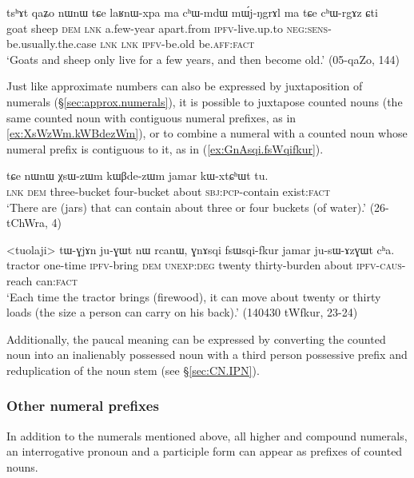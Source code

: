\begin{exe}
\ex \label{ex:laʁnWxpa}
\gll tsʰɤt qaʑo nɯnɯ tɕe laʁnɯ-xpa ma cʰɯ-mdɯ mɯ́j-ŋgrɤl ma tɕe cʰɯ-rgɤz ɕti \\
goat sheep \textsc{dem} \textsc{lnk} a.few-year apart.from \textsc{ipfv}-live.up.to \textsc{neg}:\textsc{sens}-be.usually.the.case \textsc{lnk} \textsc{lnk} \textsc{ipfv}-be.old be.\textsc{aff}:\textsc{fact} \\
\glt `Goats and sheep only live for a few years, and then become old.' (05-qaZo, 144)
\end{exe}

Just like approximate numbers can also be expressed by juxtaposition of numerals  (§\ref{sec:approx.numerals}), it is possible to juxtapose counted nouns (the same counted noun with contiguous numeral prefixes, as in \ref{ex:XsWzWm.kWBdezWm}), or to combine a numeral with a counted noun whose numeral prefix is contiguous to it, as in (\ref{ex:GnAsqi.fsWqifkur}).

\begin{exe}
\ex \label{ex:XsWzWm.kWBdezWm}
\gll tɕe nɯnɯ χsɯ-zɯm kɯβde-zɯm jamar kɯ-xtɕʰɯt tu. \\
 \textsc{lnk} \textsc{dem} three-bucket four-bucket about \textsc{sbj}:\textsc{pcp}-contain exist:\textsc{fact} \\
\glt `There are (jars) that can contain about three or four buckets (of water).' (26-tChWra, 4)
\end{exe}

\begin{exe}
\ex \label{ex:GnAsqi.fsWqifkur}
\gll <tuolaji> tɯ-ɣjɤn ju-ɣɯt nɯ rcanɯ, ɣnɤsqi fsɯsqi-fkur jamar ju-sɯ-ɤzɣɯt cʰa.  \\
 tractor one-time \textsc{ipfv}-bring \textsc{dem} \textsc{unexp}:\textsc{deg} twenty thirty-burden about \textsc{ipfv}-\textsc{caus}-reach can:\textsc{fact} \\
\glt `Each time the tractor brings (firewood), it can move about twenty or thirty loads (the size a person can carry on his back).' (140430 tWfkur, 23-24)
\end{exe}

Additionally, the paucal meaning can be expressed by converting the counted noun into an inalienably possessed noun with a third person possessive prefix and reduplication of the noun stem (see §\ref{sec:CN.IPN}).

\subsubsection{Other numeral prefixes} \label{sec:other.numeral.prefixes}
In addition to the numerals mentioned above, all higher and compound numerals, an interrogative pronoun and a participle form can appear as prefixes of counted nouns.

